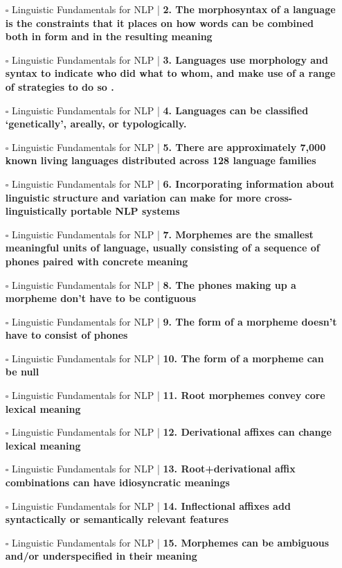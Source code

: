 \documentclass[a4, landscape, 12pt]{article}
\newcommand{\checkbox}{$\square$}%
\begin{document}
\begin{itemize}
{}
\item [\checkbox]  Linguistic Fundamentals for NLP | \textbf{ 2. The morphosyntax of a language is the constraints that it places on how words can be combined both in form and in the resulting meaning
}
\item [\checkbox]  Linguistic Fundamentals for NLP | \textbf{ 3. Languages use morphology and syntax to indicate who did what to whom, and make use of a range of strategies to do so .
}
\item [\checkbox]  Linguistic Fundamentals for NLP | \textbf{ 4. Languages can be classified ‘genetically’, areally, or typologically.
}
\item [\checkbox]  Linguistic Fundamentals for NLP | \textbf{ 5. There are approximately 7,000 known living languages distributed across 128 language families
}
\item [\checkbox]  Linguistic Fundamentals for NLP | \textbf{ 6. Incorporating information about linguistic structure and variation can make for more cross-linguistically portable NLP systems
}
\item [\checkbox]  Linguistic Fundamentals for NLP | \textbf{ 7. Morphemes are the smallest meaningful units of language, usually consisting of a sequence of phones paired with concrete meaning
}
\item [\checkbox]  Linguistic Fundamentals for NLP | \textbf{ 8. The phones making up a morpheme don’t have to be contiguous
}
\item [\checkbox]  Linguistic Fundamentals for NLP | \textbf{ 9. The form of a morpheme doesn’t have to consist of phones
}
\item [\checkbox]  Linguistic Fundamentals for NLP | \textbf{ 10. The form of a morpheme can be null
}
\item [\checkbox]  Linguistic Fundamentals for NLP | \textbf{ 11. Root morphemes convey core lexical meaning
}
\item [\checkbox]  Linguistic Fundamentals for NLP | \textbf{ 12. Derivational affixes can change lexical meaning
}
\item [\checkbox]  Linguistic Fundamentals for NLP | \textbf{ 13. Root+derivational affix combinations can have idiosyncratic meanings
}
\item [\checkbox]  Linguistic Fundamentals for NLP | \textbf{ 14. Inflectional affixes add syntactically or semantically relevant features
}
\item [\checkbox]  Linguistic Fundamentals for NLP | \textbf{ 15. Morphemes can be ambiguous and/or underspecified in their meaning
}
\end{itemize}
\end{document}
